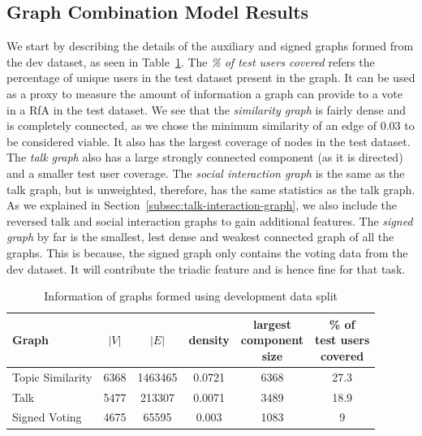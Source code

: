 \subsection{Graph Combination Model Results}
We start by describing the details of the auxiliary and signed graphs formed from the dev dataset, as seen in Table~\ref{tab:test-graphs}.
The \textit{\% of test users covered} refers the percentage of unique users in the test dataset present in the graph. 
It can be used as a proxy to measure the amount of information a graph can provide to a vote in a RfA in the test dataset.
We see that the \textit{similarity graph} is fairly dense and is completely connected, as we chose the minimum similarity of an edge of $0.03$ to be considered viable.
It also has the largest coverage of nodes in the test dataset.
The \textit{talk graph} also has a large strongly connected component (as it is directed) and a smaller test user coverage.
The \textit{social interaction graph} is the same as the talk graph, but is unweighted, therefore, has the same statistics as the talk graph.
As we explained in Section~\ref{subsec:talk-interaction-graph}, we also include the reversed talk and social interaction graphs to gain additional features.
The \textit{signed graph} by far is the smallest, lest dense and weakest connected graph of all the graphs.
This is because, the signed graph only contains the voting data from the dev dataset.
It will contribute the triadic feature and is hence fine for that task.

\begin{table}[htp]
    \centering
    \caption{Information of graphs formed using development data split}
    \label{tab:test-graphs}
    \begin{tabular}{lccccc}
        \toprule
        Graph & $|V|$ & $|E|$ & density & \shortstack{largest\\  component \\size} & \shortstack{\% of \\test users\\ covered}\\ 
        \midrule
        
        Topic Similarity & 6368 &1463465 & 0.0721 & 6368 & 27.3\\
        
        Talk  & 5477 & 213307 & 0.0071 & 3489 & 18.9\\

        Signed Voting & 4675 & 65595 & 0.003 & 1083 & 9\\

        \bottomrule
        \end{tabular}
\end{table}

